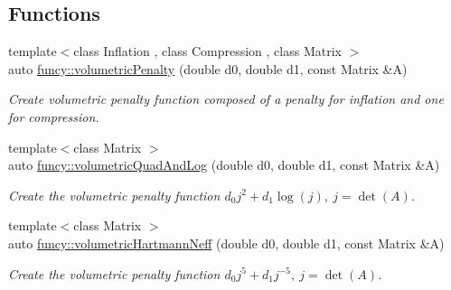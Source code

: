\subsection*{Functions}
\begin{DoxyCompactItemize}
\item 
{\footnotesize template$<$class Inflation , class Compression , class Matrix $>$ }\\auto \hyperlink{namespacefuncy_ad7b38a36bcc24177861b72ff8344e485}{funcy\-::volumetric\-Penalty} (double d0, double d1, const Matrix \&A)
\begin{DoxyCompactList}\small\item\em Create volumetric penalty function composed of a penalty for inflation and one for compression. \end{DoxyCompactList}\item 
{\footnotesize template$<$class Matrix $>$ }\\auto \hyperlink{namespacefuncy_ac40004b4dfa21588792d2986dcc840f4}{funcy\-::volumetric\-Quad\-And\-Log} (double d0, double d1, const Matrix \&A)
\begin{DoxyCompactList}\small\item\em Create the volumetric penalty function $ d_0 j^2 + d_1 \log(j),\ j=\det(A) $. \end{DoxyCompactList}\item 
{\footnotesize template$<$class Matrix $>$ }\\auto \hyperlink{namespacefuncy_a367b4ff89659b6d3b1c2fd54ce5b2d11}{funcy\-::volumetric\-Hartmann\-Neff} (double d0, double d1, const Matrix \&A)
\begin{DoxyCompactList}\small\item\em Create the volumetric penalty function $ d_0 j^5 + d_1 j^{-5},\ j=\det(A) $. \end{DoxyCompactList}\end{DoxyCompactItemize}

